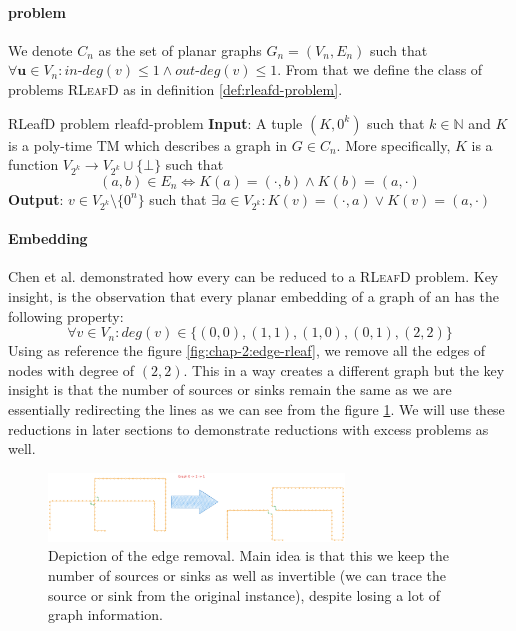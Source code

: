 \paragraph{ problem}
We denote $C_n$ as the set of planar graphs $G_n = (V_n,E_n)$ such that
$\forall \mathbf{u} \in V_n: \textit{in-deg}(v) \leq 1 \wedge \textit{out-deg}(v) \leq 1$. From that we define
the class of problems \textsc{RLeafD} as in definition \ref{def:rleafd-problem}.


\begin{definitionbox}{RLeafD problem \cite{chen_Complexity2DDiscrete_2009}}{rleafd-problem}
    \label{def:rleafd-problem}
    \textbf{Input}: A tuple $(K, 0^k)$ such that $k \in \mathbb{N}$ and $K$ is a poly-time TM
    which describes a graph in $G \in C_n$.
    More specifically, $K$ is a function $V_{2^k} \to V_{2^k} \cup \{\bot\}$ such that
    $$
        (a,b) \in E_n \iff K(a) = (\cdot, b) \wedge  K(b) = (a, \cdot)
    $$
    \textbf{Output}: $v \in V_{2^k} \setminus \{0^n\}$ such that
    $\exists a \in V_{2^k}: K(v) = (\cdot, a) \vee K(v) = (a, \cdot)$
\end{definitionbox}

\paragraph{Embedding }
Chen et al. \cite{chen_Complexity2DDiscrete_2009} demonstrated how every  can be reduced to a
\textsc{RLeafD} problem. Key insight, is the observation that every planar embedding of a graph of an 
has the following property:
$$
    \forall v \in V_n: \textit{deg}(v) \in \{(0,0), (1,1), (1,0), (0,1), (2,2)\}
$$
Using as reference the figure \ref{fig:chap-2:edge-rleaf}, we remove all the edges of nodes with degree of $(2,2)$.
This in a way creates a different graph but the key insight is that the number of sources or sinks remain the same as we are essentially redirecting the lines
as we can see from the figure \ref{fig:chap-2:rleaf-eol}. We will use these reductions in later sections to demonstrate reductions with excess problems as well.

\begin{figure}[h!]
    \centering
    \includegraphics[width=0.7\textwidth]{Chapter2/reduced-EOL.pdf}
    \caption{Depiction of the edge removal. Main idea is that this we keep the number of sources or sinks as well as invertible (we can trace the source or sink from the original instance),
        despite losing a lot of graph information.}
    \label{fig:chap-2:rleaf-eol}
\end{figure}




